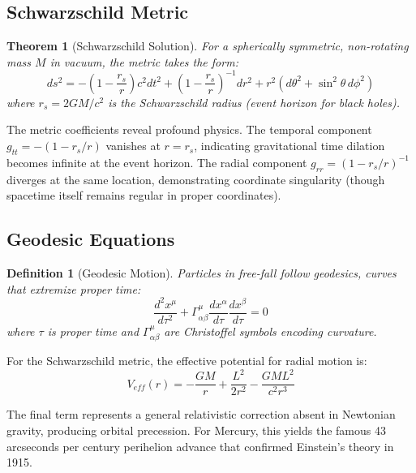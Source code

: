 \documentclass[a4paper, 11pt]{article}
\newtheorem{definition}{Definition}[section]
\newtheorem{theorem}{Theorem}[section]
\begin{document}
\subsection{Schwarzschild Metric}

\begin{theorem}[Schwarzschild Solution]
For a spherically symmetric, non-rotating mass $M$ in vacuum, the metric takes the form:
\begin{equation}
ds^2 = -\left(1 - \frac{r_s}{r}\right)c^2dt^2 + \left(1 - \frac{r_s}{r}\right)^{-1}dr^2 + r^2(d\theta^2 + \sin^2\theta\,d\phi^2)
\end{equation}
where $r_s = 2GM/c^2$ is the Schwarzschild radius (event horizon for black holes).
\end{theorem}

The metric coefficients reveal profound physics. The temporal component $g_{tt} = -(1-r_s/r)$
vanishes at $r=r_s$, indicating gravitational time dilation becomes infinite at the event
horizon. The radial component $g_{rr} = (1-r_s/r)^{-1}$ diverges at the same location,
demonstrating coordinate singularity (though spacetime itself remains regular in proper coordinates).

\subsection{Geodesic Equations}

\begin{definition}[Geodesic Motion]
Particles in free-fall follow geodesics, curves that extremize proper time:
\begin{equation}
\frac{d^2x^\mu}{d\tau^2} + \Gamma^\mu_{\alpha\beta}\frac{dx^\alpha}{d\tau}\frac{dx^\beta}{d\tau} = 0
\end{equation}
where $\tau$ is proper time and $\Gamma^\mu_{\alpha\beta}$ are Christoffel symbols encoding curvature.
\end{definition}

For the Schwarzschild metric, the effective potential for radial motion is:
\begin{equation}
V_{eff}(r) = -\frac{GM}{r} + \frac{L^2}{2r^2} - \frac{GML^2}{c^2r^3}
\end{equation}

The final term represents a general relativistic correction absent in Newtonian gravity,
producing orbital precession. For Mercury, this yields the famous 43 arcseconds per century
perihelion advance that confirmed Einstein's theory in 1915.
\end{document}
